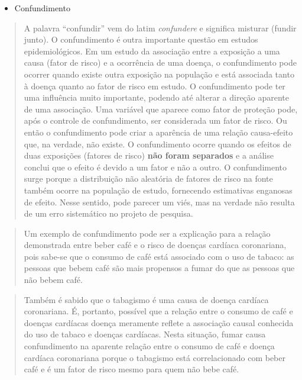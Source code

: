 \documentclass[
]{book}
\providecommand{\tightlist}{%
  \setlength{\itemsep}{0pt}\setlength{\parskip}{0pt}}
\begin{document}
\begin{itemize}
\tightlist
\item
  Confundimento
\end{itemize}

\hfill\break

\begin{quote}
A palavra ``confundir'' vem do latim \emph{confundere} e significa misturar (fundir junto). O confundimento é outra importante questão em estudos epidemiológicos. Em um estudo da associação entre a exposição a uma causa (fator de risco) e a ocorrência de uma doença, o confundimento pode ocorrer quando existe outra exposição na população e está associada tanto à doença quanto ao fator de risco em estudo. O confundimento pode ter uma influência muito importante, podendo até alterar a direção aparente de uma associação. Uma variável que aparece como fator de proteção pode, após o controle de confundimento, ser considerada um fator de risco. Ou então o confundimento pode criar a aparência de uma relação causa-efeito que, na verdade, não existe. O confundimento ocorre quando os efeitos de duas exposições (fatores de risco) \textbf{não foram separados} e a análise conclui que o efeito é devido a um fator e não a outro. O confundimento surge porque a distribuição não aleatória de fatores de risco na fonte também ocorre na população de estudo, fornecendo estimativas enganosas de efeito. Nesse sentido, pode parecer um viés, mas na verdade não resulta de um erro sistemático no projeto de pesquisa.
\end{quote}

\hfill\break

\begin{quote}
Um exemplo de confundimento pode ser a explicação para a relação demonstrada entre beber café e o risco de doenças cardíaca coronariana, pois sabe-se que o consumo de café está associado com o uso de tabaco: as pessoas que bebem café são mais propensos a fumar do que as pessoas que não bebem café.
\end{quote}

\hfill\break

\begin{quote}
Também é sabido que o tabagismo é uma causa de doença cardíaca coronariana. É, portanto, possível que a relação entre o consumo de café e doenças cardíacas doença meramente reflete a associação causal conhecida do uso de tabaco e doenças cardíacas. Nesta situação, fumar causa confundimento na aparente relação entre o consumo de café e doença cardíaca coronariana porque o tabagismo está correlacionado com beber café e é um fator de risco mesmo para quem não bebe café.
\end{quote}
\end{document}
